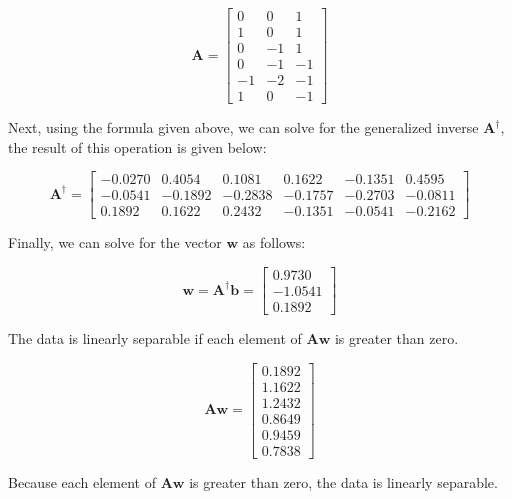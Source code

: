\documentclass[fleqn]{article}
\begin{document}
\begin{enumerate}
		\begin{equation*}
			\mathbf{A} = \begin{bmatrix}
				0  &  0 &  1 \\
				1  &  0 &  1 \\
				0  & -1 &  1 \\
				0  & -1 & -1 \\
			   -1  & -2 & -1 \\
			    1  &  0 & -1
			\end{bmatrix}
		\end{equation*}
		
		Next, using the formula given above, we can solve for the generalized inverse $\mathbf{A}^{\dag}$, the result of this operation is given below:
		
		\begin{equation*}
			\mathbf{A}^{\dag} = \begin{bmatrix} 
			   -0.0270 &  0.4054 &  0.1081 &  0.1622 & -0.1351 &  0.4595 \\
			   -0.0541 & -0.1892 & -0.2838 & -0.1757 & -0.2703 & -0.0811 \\
			    0.1892 &  0.1622 &  0.2432 & -0.1351 & -0.0541 & -0.2162
			\end{bmatrix}
		\end{equation*}
		
		Finally, we can solve for the vector $\mathbf{w}$ as follows:
		
		\begin{equation*}
			\mathbf{w} = \mathbf{A}^{\dag}\mathbf{b} = \begin{bmatrix} 0.9730 \\ -1.0541 \\ 0.1892 \end{bmatrix}
		\end{equation*}
		
		The data is linearly separable if each element of $\mathbf{A}\mathbf{w}$ is greater than zero.
		
		\begin{equation*}
			\mathbf{A}\mathbf{w} = \begin{bmatrix}
				0.1892 \\
    				1.1622 \\
   	 			1.2432 \\
    				0.8649 \\
    				0.9459 \\
    				0.7838
			\end{bmatrix}
		\end{equation*}
		
		Because each element of $\mathbf{A}\mathbf{w}$ is greater than zero, the data is linearly separable.
		
	\end{enumerate}
\end{document}
